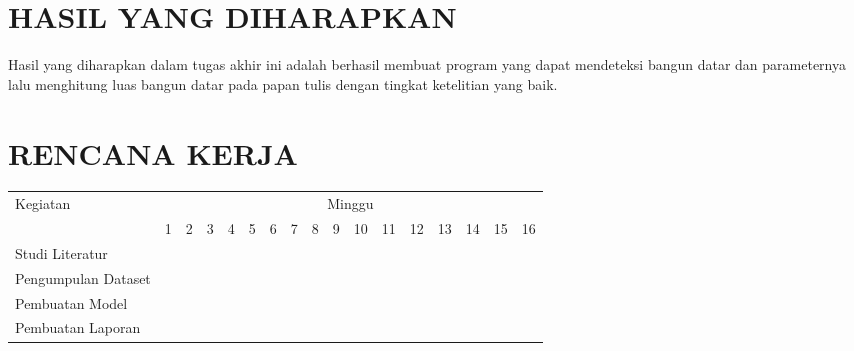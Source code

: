 \section{HASIL YANG DIHARAPKAN}

Hasil yang diharapkan dalam tugas akhir ini adalah berhasil membuat program yang dapat mendeteksi bangun datar dan parameternya lalu menghitung luas bangun datar pada papan tulis dengan tingkat ketelitian yang baik.

\section{RENCANA KERJA}

\newcommand{\w}{}
\newcommand{\G}{\cellcolor{gray}}
\begin{table}[h!]
  \begin{tabular}{|p{3.5cm}|c|c|c|c|c|c|c|c|c|c|c|c|c|c|c|c|}

    \hline
    \multirow{2}{*}{Kegiatan} & \multicolumn{16}{|c|}{Minggu} \\
    \cline{2-17} &
    1 & 2 & 3 & 4 & 5 & 6 & 7 & 8 & 9 & 10 & 11 & 12 & 13 & 14 & 15 & 16 \\
    \hline

    Studi Literatur &
    \G & \G & \G & \w & \w & \w & \w & \w & \w & \w & \w & \w & \w & \w & \w & \w \\
    \hline

    Pengumpulan Dataset &
    \w & \w & \w & \G & \G & \G & \w & \w & \w & \w & \w & \w & \w & \w & \w & \w \\
    \hline

    Pembuatan Model &
    \w & \w & \w & \w & \w & \G & \G & \G & \G & \G & \G & \G & \G & \w & \w & \w \\
    \hline

    
    Pembuatan Laporan &
    \G & \G & \G & \G & \G & \G & \G & \G & \G & \G & \G & \G & \G & \G & \G & \G \\
    \hline

  \end{tabular}
\end{table}